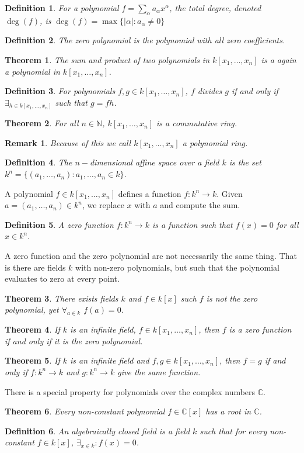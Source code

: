 \documentclass[oneside]{book}
\theoremstyle{mystyle}
\newtheorem{theorem}{Theorem}[section]
\newtheorem{definition}{Definition}[section]
\newtheorem{remark}{Remark}[section]
\begin{document}
\begin{definition}
For a polynomial $f=\sum_{\alpha}a_\alpha x^\alpha$, the total degree, denoted $\deg(f)$, is $\deg(f) = \max\{|\alpha|:a_\alpha \ne 0\}$
\end{definition}
\begin{definition}
The zero polynomial is the polynomial with all zero coefficients.
\end{definition}
\begin{theorem}
The sum and product of two polynomials in $k[x_1,\hdots ,x_n]$ is a again a polynomial in $k[x_1,\hdots ,x_n]$.
\end{theorem}
\begin{definition}
For polynomials $f,g\in k[x_1,\hdots ,x_n]$, $f$ divides $g$ if and only if $\exists_{h\in k[x_1,\hdots ,x_n]}$ such that $g = fh$.
\end{definition}
\begin{theorem}
For all $n\in \mathbb{N}$, $k[x_1,\hdots ,x_n]$ is a commutative ring.
\end{theorem}
\begin{remark}
Because of this we call $k[x_1,\hdots ,x_n]$ a polynomial ring.
\end{remark}
\begin{definition}
The $n-$dimensional affine space over a field $k$ is the set $k^n = \{(a_1,\hdots, a_n):a_1,\hdots,a_n \in k\}$.
\end{definition}
A polynomial $f\in k[x_1,\hdots ,x_n]$ defines a function $f:k^n \rightarrow k$. Given $a=(a_1,\hdots, a_n) \in k^n$, we replace $x$ with $a$ and compute the sum. 
\begin{definition}
A zero function $f:k^n \rightarrow k$ is a function such that $f(x) = 0$ for all $x\in k^n$.
\end{definition}
A zero function and the zero polynomial are not necessarily the same thing. That is there are fields $k$ with non-zero polynomials, but such that the polynomial evaluates to zero at every point.
\begin{theorem}
There exists fields $k$ and $f\in k[x]$ such $f$ is not the zero polynomial, yet $\forall_{a\in k}$ $f(a) = 0$.
\end{theorem}
\begin{theorem}
If $k$ is an infinite field, $f\in k[x_1,\hdots ,x_n]$, then $f$ is a zero function if and only if it is the zero polynomial.
\end{theorem}
\begin{theorem}
If $k$ is an infinite field and $f,g\in k[x_1,\hdots ,x_n]$, then $f=g$ if and only if $f:k^n\rightarrow k$ and $g:k^n \rightarrow k$ give the same function.
\end{theorem}
There is a special property for polynomials over the complex numbers $\mathbb{C}$.
\begin{theorem}
Every non-constant polynomial $f\in \mathbb{C}[x]$ has a root in $\mathbb{C}$.
\end{theorem}
\begin{definition}
An algebraically closed field is a field $k$ such that for every non-constant $f\in k[x]$, $\exists_{x\in k}: f(x)=0$.
\end{definition}
\end{document}

